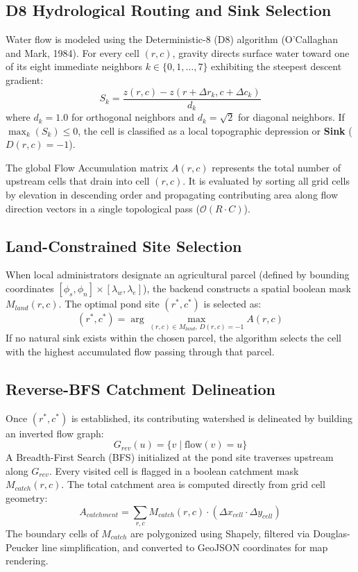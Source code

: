 \documentclass[manuscript,screen]{acmart}
\begin{document}
\subsection{D8 Hydrological Routing and Sink Selection}
Water flow is modeled using the Deterministic-8 (D8) algorithm (O'Callaghan and Mark, 1984). For every cell $(r, c)$, gravity directs surface water toward one of its eight immediate neighbors $k \in \{0, 1, \dots, 7\}$ exhibiting the steepest descent gradient:
\begin{equation}
    S_k = \frac{z(r, c) - z(r + \Delta r_k, c + \Delta c_k)}{d_k}
\end{equation}
where $d_k = 1.0$ for orthogonal neighbors and $d_k = \sqrt{2}$ for diagonal neighbors. If $\max_k(S_k) \le 0$, the cell is classified as a local topographic depression or \textbf{Sink} ($D(r, c) = -1$).

The global Flow Accumulation matrix $A(r, c)$ represents the total number of upstream cells that drain into cell $(r, c)$. It is evaluated by sorting all grid cells by elevation in descending order and propagating contributing area along flow direction vectors in a single topological pass ($\mathcal{O}(R \cdot C)$).

\subsection{Land-Constrained Site Selection}
When local administrators designate an agricultural parcel (defined by bounding coordinates $[\phi_s, \phi_n] \times [\lambda_w, \lambda_e]$), the backend constructs a spatial boolean mask $M_{land}(r, c)$. The optimal pond site $(r^*, c^*)$ is selected as:
\begin{equation}
    (r^*, c^*) = \arg\max_{(r, c) \in M_{land}, \, D(r, c) = -1} A(r, c)
\end{equation}
If no natural sink exists within the chosen parcel, the algorithm selects the cell with the highest accumulated flow passing through that parcel.

\subsection{Reverse-BFS Catchment Delineation}
Once $(r^*, c^*)$ is established, its contributing watershed is delineated by building an inverted flow graph:
\begin{equation}
    G_{rev}(u) = \{ v \mid \text{flow}(v) = u \}
\end{equation}
A Breadth-First Search (BFS) initialized at the pond site traverses upstream along $G_{rev}$. Every visited cell is flagged in a boolean catchment mask $M_{catch}(r, c)$. The total catchment area is computed directly from grid cell geometry:
\begin{equation}
    A_{catchment} = \sum_{r, c} M_{catch}(r, c) \cdot (\Delta x_{cell} \cdot \Delta y_{cell})
\end{equation}
The boundary cells of $M_{catch}$ are polygonized using Shapely, filtered via Douglas-Peucker line simplification, and converted to GeoJSON coordinates for map rendering.
\end{document}
